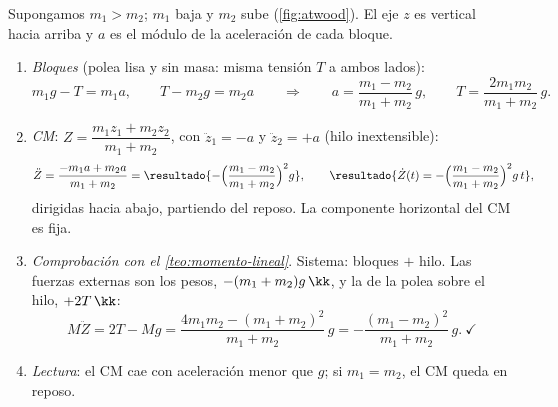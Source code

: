 \begin{resolucion}
Supongamos $m_{1}>m_{2}$; $m_{1}$ baja y $m_{2}$ sube (\cref{fig:atwood}). El eje $z$ es
vertical hacia arriba y $a$ es el módulo de la aceleración de cada bloque.
\begin{enumerate}
  \item \emph{Bloques} (polea lisa y sin masa: misma tensión $T$ a ambos lados):
  \[
    m_{1}g-T=m_{1}a,\qquad T-m_{2}g=m_{2}a
    \qquad\Longrightarrow\qquad
    a=\frac{m_{1}-m_{2}}{m_{1}+m_{2}}\,g,\qquad T=\frac{2m_{1}m_{2}}{m_{1}+m_{2}}\,g .
  \]
  \item \emph{CM}: $Z=\dfrac{m_{1}z_{1}+m_{2}z_{2}}{m_{1}+m_{2}}$, con $\ddot z_{1}=-a$ y $\ddot z_{2}=+a$ (hilo inextensible):
  \[
    \ddot Z=\frac{-m_{1}a+m_{2}a}{m_{1}+m_{2}}
    =\resultado{-\Bigl(\frac{m_{1}-m_{2}}{m_{1}+m_{2}}\Bigr)^{2}g},
    \qquad
    \resultado{\dot Z(t)=-\Bigl(\frac{m_{1}-m_{2}}{m_{1}+m_{2}}\Bigr)^{2}g\,t},
  \]
  dirigidas hacia abajo, partiendo del reposo. La componente horizontal del CM es fija.
  \item \emph{Comprobación con el \cref{teo:momento-lineal}}. Sistema: bloques $+$ hilo.
  Las fuerzas externas son los pesos, $-(m_{1}+m_{2})g\,\kk$, y la de la polea sobre el
  hilo, $+2T\,\kk$:
  \[
    M\ddot Z=2T-Mg=\frac{4m_{1}m_{2}-(m_{1}+m_{2})^{2}}{m_{1}+m_{2}}\,g=-\frac{(m_{1}-m_{2})^{2}}{m_{1}+m_{2}}\,g .\ \checkmark
  \]
  \item \emph{Lectura}: el CM cae con aceleración menor que $g$; si $m_{1}=m_{2}$, el CM
  queda en reposo.\qedhere
\end{enumerate}
\end{resolucion}

